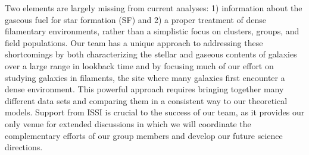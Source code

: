 \documentclass[11pt]{article}
\begin{document}
Two elements are largely missing from current analyses: 1) information about the gaseous fuel for star formation (SF) and 2) a proper treatment of dense filamentary environments, rather than a simplistic focus on clusters, groups, and field populations. Our team has a unique approach to addressing these shortcomings by both characterizing the stellar and gaseous contents of galaxies over a large range in lookback time and by focusing much of our effort on studying galaxies in filaments, the site where many galaxies first encounter a dense environment.  This powerful approach requires bringing together many different data sets and comparing them in a consistent way to our theoretical models.  Support from ISSI is crucial to the success of our team, as it provides our only venue for extended discussions in which we will coordinate the complementary efforts of our group members and develop our future science directions.

\end{document}
